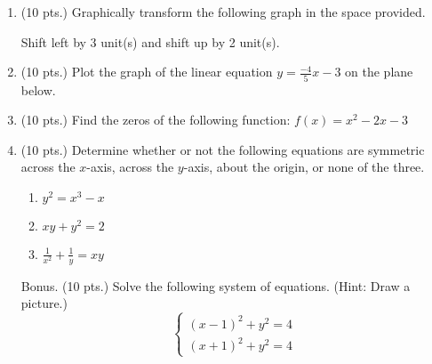 \documentclass{article}
\begin{document}
\begin{enumerate}
\item (10 pts.) Graphically transform the following graph in the space provided.

\begin{center}
Shift left by 3 unit(s) and shift up by 2 unit(s).
\end{center}

\begin{center}
\MiniGraph[gadget=elliptic3]
\end{center}

   \vspace{1cm}

\newpage

\item (10 pts.) Plot the graph of the linear equation $y = \frac{-4}{5} x - 3$ on the plane below.\begin{center}
\CartesianPlane[h=7,w=7,axes=yes]
\end{center}

  

\item (10 pts.) Find the zeros of the following function: $f(x) = x^2 - 2x - 3$ \vspace{3cm}

\item (10 pts.) Determine whether or not the following equations are symmetric across the $x$-axis, across the $y$-axis, about the origin, or none of the three.

\begin{enumerate}
\item $y^2 = x^3 - x$ \vspace{3cm}
\item $xy + y^2 = 2$ \vspace{3cm}
\item $\displaystyle\frac{1}{x^2} + \displaystyle\frac{1}{y} = xy$ \vspace{3cm}
\end{enumerate}

 \vspace{1cm}

\newpage

\item[Bonus.] (10 pts.) Solve the following system of equations. (Hint: Draw a picture.) \[ \left\{ \begin{array}{l} (x-1)^2 + y^2 = 4 \\ (x+1)^2 + y^2 = 4 \end{array} \right. \]

\end{enumerate}
\end{document}
